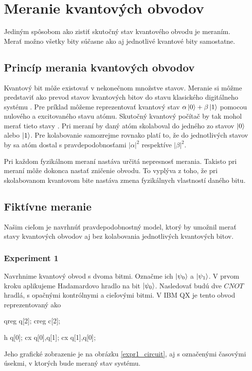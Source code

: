 
\chapter{Meranie kvantových obvodov}

Jediným spôsobom ako zistiť skutočný stav kvantového obvodu je meraním.
Merať možno všetky bity súčasne ako aj jednotlivé kvantové bity samostatne.

\section{Princíp merania kvantových obvodov}

Kvantový bit môže existovať v nekonečnom množstve stavov. Meranie si môžme 
predstaviť ako prevod stavov kvantových bitov do stavu klasického digitálneho
systému \cite{Nie10}. Pre príklad môžeme reprezentovať kvantový stav 
\(\alpha\ket{0} + \beta\ket{1}\) pomocou nulového a excitovaného stavu atómu.
Skutočný kvantový počítač by tak mohol merať tieto stavy \cite{Sim97}
. Pri meraní by 
daný atóm skolaboval do jedného zo stavov \(\ket{0}\) alebo \(\ket{1}\).
Pre kolabovanie samozrejme rovnako platí to, že do jednotlivých stavov by
sa atóm dostal s pravdepodobnosťami \(|\alpha|^2\) respektíve \(|\beta|^2\).


Pri každom fyzikálnom meraní nastáva určitá nepresnosť merania. Takisto 
pri meraní môže dokonca nastať zničenie obvodu. To vyplýva z toho, že pri
skolabovanom kvantovom bite nastáva zmena fyzikálnych vlastností daného bitu. 

\section{Fiktívne meranie}

Našim cieľom je navrhnúť pravdepodobnostný model, ktorý by umožnil merať
stavy kvantových obvodov aj bez kolabovania jednotlivých kvantových bitov.

\subsection{Experiment 1}
Navrhnime kvantový obvod s dvoma bitmi. Označme ich \(\ket{\psi_0}\) a 
\(\ket{\psi_1}\). V prvom kroku aplikujeme Hadamardovo hradlo na bit 
\(\ket{\psi_0}\). Nasledovať budú dve \(CNOT\) hradlá, s opačnými kontrólnymi 
a cieľovými bitmi. V IBM QX je tento obvod reprezentovaný ako 
\begin{code}
qreg q[2];
creg c[2];

h q[0];
cx q[0],q[1];
cx q[1],q[0];
\end{code}
Jeho grafické zobrazenie je na obrázku \ref{expr1_circuit}, aj s označenými
časovými úsekmi, v ktorých bude meraný stav systému. 

